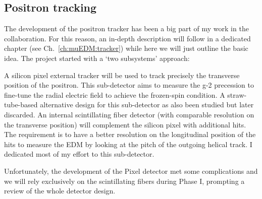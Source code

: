 \begin{refsection}
    \subsection{Positron tracking}
        The development of the positron tracker has been a big part of my work in the collaboration.
        For this reason, an in-depth description will follow in a dedicated chapter (see Ch.~\ref{ch:muEDM:tracker}) while here we will just outline the basic idea.
        The project started with a `two subsystems' approach:
        \begin{outline}
            \1 A silicon pixel external tracker will be used to track precisely the transverse position of the positron. 
            This sub-detector aims to measure the g-2 precession to fine-tune the radial electric field to achieve the frozen-spin condition.
            A straw-tube-based alternative design for this sub-detector as also been studied but later discarded.
            \1 An internal scintillating fiber detector (with comparable resolution on the transverse position) will complement the silicon pixel with additional hits. 
            The requirement is to have a better resolution on the longitudinal position of the hits to measure the EDM by looking at the pitch of the outgoing helical track.
            I dedicated most of my effort to this sub-detector.
        \end{outline}
        Unfortunately, the development of the Pixel detector met some complications and we will rely exclusively on the scintillating fibers during Phase I, prompting a review of the whole detector design.  


\end{refsection}
